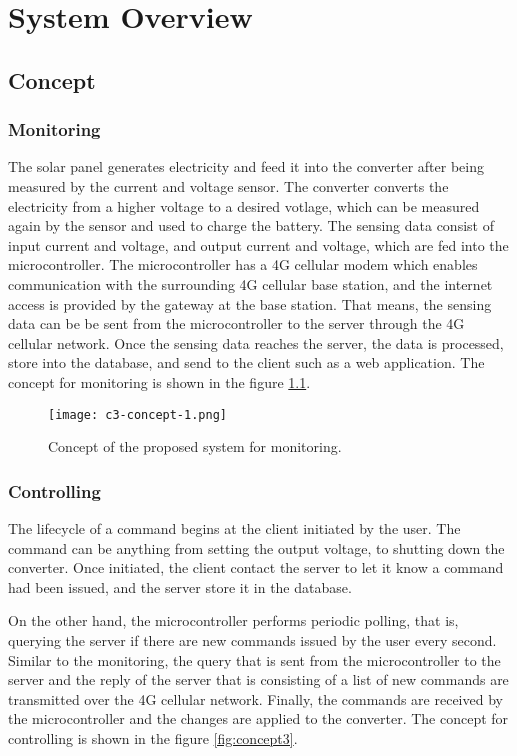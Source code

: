 \documentclass[../thesis.tex]{subfiles}
\begin{document}
\chapter{System Overview}

\section{Concept}


\subsection{Monitoring}
The solar panel generates electricity and feed it into the converter after being measured by the current and voltage sensor. The converter converts the electricity from a higher voltage to a desired votlage, which can be measured again by the sensor and used to charge the battery. The sensing data consist of input current and voltage, and output current and voltage, which are fed into the microcontroller. The microcontroller has a 4G cellular modem which enables communication with the surrounding 4G cellular base station, and the internet access is provided by the gateway at the base station. That means, the sensing data can be be sent from the microcontroller to the server through the 4G cellular network. Once the sensing data reaches the server, the data is processed, store into the database, and send to the client such as a web application. The concept for monitoring is shown in the figure \ref{fig:concept1}.

\begin{figure}[!ht]
  \texttt{[image: c3-concept-1.png]}
  \caption{Concept of the proposed system for monitoring.}
  \label{fig:concept1}
\end{figure}


\newpage
\subsection{Controlling}
The lifecycle of a command begins at the client initiated by the user. The command can be anything from setting the output voltage, to shutting down the converter. Once initiated, the client contact the server to let it know a command had been issued, and the server store it in the database. 

On the other hand, the microcontroller performs periodic polling, that is, querying the server if there are new commands issued by the user every second. Similar to the monitoring, the query that is sent from the microcontroller to the server and the reply of the server that is consisting of a list of new commands are transmitted over the 4G cellular network. Finally, the commands are received by the microcontroller and the changes are applied to the converter. The concept for controlling is shown in the figure \ref{fig:concept3}.
\end{document}
